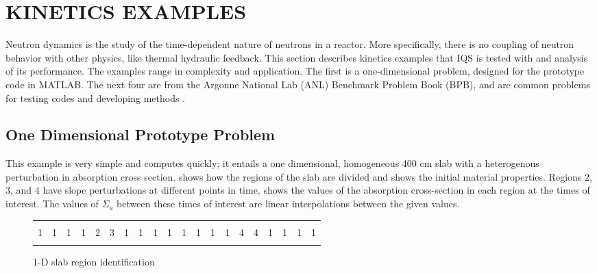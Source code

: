 %
%
%



\chapter{KINETICS EXAMPLES}\label{sect:kin}

Neutron dynamics is the study of the time-dependent nature of neutrons in a reactor.  More specifically, there is no coupling of neutron behavior with other physics, like thermal hydraulic feedback.  This section describes kinetics examples that IQS is tested with and analysis of its performance.  The examples range in complexity and application.  The first is a one-dimensional problem, designed for the prototype code in MATLAB.  The next four are from the Argonne National Lab (ANL) Benchmark Problem Book (BPB), and are common problems for testing codes and developing methods \cite{ANL_BPB}. 

\section{One Dimensional Prototype Problem}

This example is very simple and computes quickly; it entails a one dimensional, homogeneous 400 cm slab with a heterogenous perturbation in absorption cross section.   shows how the regions of the slab are divided and  shows the initial material properties.  Regions 2, 3, and 4 have slope perturbations at different points in time,  shows the values of the absorption cross-section in each region at the times of interest.  The values of $\Sigma_a$ between these times of interest are linear interpolations between the given values.

\begin{figure}[!htbp]
\begin{center}
\begin{tabular}{| l | l | l | l | l | l | l | l | l | l | l | l | l | l | l | l | l | l | l | l |}
\hline \hline \hline
  &   &   &   &   &   &    &    &   &   &   &   &   &   &   &   &   &   &   &   \\
1 & 1 & 1 & 1 & 2 & 3 & 1 & 1 & 1 & 1 & 1 & 1 & 1 & 1 & 4 & 4 & 1 & 1 & 1 & 1 \\
  &   &   &   &   &   &    &    &   &   &   &   &   &   &   &   &   &   &   &   \\
\hline \hline \hline
\end{tabular}
\caption{1-D slab region identification}
\label{fig:slab}
\end{center}
\end{figure}

